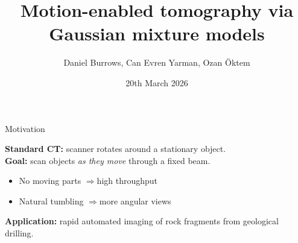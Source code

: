 \documentclass{beamer}
\title{Motion-enabled tomography via Gaussian mixture models}
\author{Daniel Burrows, Can Evren Yarman, Ozan \"Oktem}
\date{20th March 2026}
\begin{document}
    \begin{frame}[plain]
        \maketitle
    \end{frame}

    \begin{frame}{Motivation}

        \textbf{Standard CT:} scanner rotates around a stationary object. \\[0.8em]

        \pause
        \textbf{Goal:} scan objects \emph{as they move} through a fixed beam.
        \begin{itemize}
            \item No moving parts \quad$\Rightarrow$\quad high throughput
            \item Natural tumbling \quad$\Rightarrow$\quad more angular views
        \end{itemize}

        \pause
        \vspace{0.6em}
        \textbf{Application:} rapid automated imaging of rock fragments from geological drilling.

    \end{frame}
\end{document}
